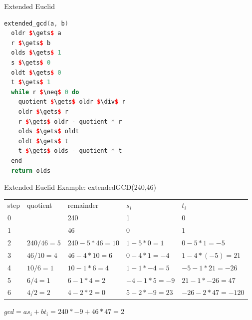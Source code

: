 \begin{withoutheadline}
\begin{frame}[fragile]{Extended Euclid}
\begin{lstlisting}[language=c++,mathescape=true]
extended_gcd(a, b)
  oldr $\gets$ a
  r $\gets$ b
  olds $\gets$ 1
  s $\gets$ 0
  oldt $\gets$ 0
  t $\gets$ 1
  while r $\neq$ 0 do
    quotient $\gets$ oldr $\div$ r
    oldr $\gets$ r
    r $\gets$ oldr - quotient * r
    olds $\gets$ oldt
    oldt $\gets$ t
    t $\gets$ olds - quotient * t
  end
  return olds
\end{lstlisting}    
\end{frame}

\begin{frame}[fragile]{Extended Euclid}
    Example: extendedGCD(240,46)
\begin{tabular}{p{0.8cm}|p{2cm}|p{2cm}|p{2cm}|p{2cm}} %
step & quotient       & remainder            & $s_i$            & $t_i$             \\     
0    &                & 240                  & 1                & $0$               \\ 
1    &                & 46                  & $0$               & $1$               \\   
2    & $240 / 46 = 5$ & $240 - 5 * 46 = 10$ & $1 - 5*0 = 1$     & $0 - 5*1 = -5$    \\ 
3    & $46 / 10 = 4$  & $46 - 4 * 10 = 6$   & $0 - 4*1 = -4$    & $1 - 4*(-5) = 21$ \\
4    & $10 / 6 = 1$   & $10 - 1 * 6 = 4$    & $1 - 1*-4 = 5$    & $-5 - 1*21 = -26$ \\
5    & $6 / 4 = 1$    & $6 - 1 * 4 = 2$     & $-4 -1*5 = -9$    & $21 - 1*-26 = 47$ \\
6    & $4 / 2 = 2$    & $4 - 2 * 2 = 0$     & $5 - 2*-9 = 23$ & $-26 - 2*47 = -120$ \\
\end{tabular}
$gcd = a s_i + b t_i = 240*-9 + 46*47 = 2$
\end{frame}


\end{withoutheadline}
